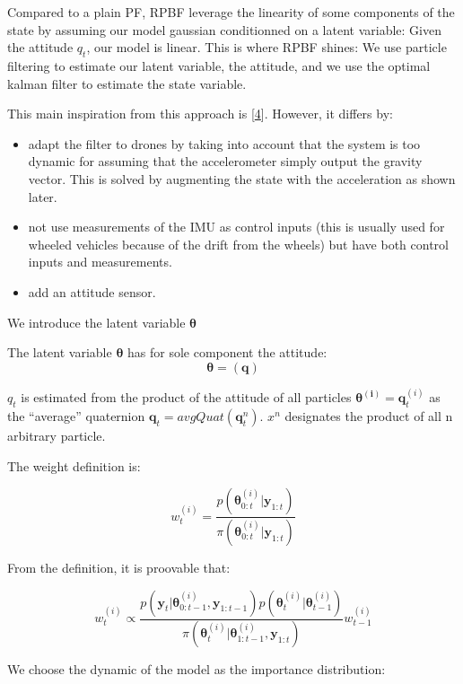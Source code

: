 \documentclass[12pt,]{article}
\providecommand{\tightlist}{%
  \setlength{\itemsep}{0pt}\setlength{\parskip}{0pt}}
\begin{document}
Compared to a plain PF, RPBF leverage the linearity of some components
of the state by assuming our model gaussian conditionned on a latent
variable: Given the attitude \(q_t\), our model is linear. This is where
RPBF shines: We use particle filtering to estimate our latent variable,
the attitude, and we use the optimal kalman filter to estimate the state
variable.

This main inspiration from this approach is
{[}\protect\hyperlink{ref-vernaza_rao-blackwellized_2006}{4}{]}.
However, it differs by:

\begin{itemize}
\tightlist
\item
  adapt the filter to drones by taking into account that the system is
  too dynamic for assuming that the accelerometer simply output the
  gravity vector. This is solved by augmenting the state with the
  acceleration as shown later.
\item
  not use measurements of the IMU as control inputs (this is usually
  used for wheeled vehicles because of the drift from the wheels) but
  have both control inputs and measurements.
\item
  add an attitude sensor.
\end{itemize}

We introduce the latent variable \(\boldsymbol{\theta}\)

The latent variable \(\boldsymbol{\theta}\) has for sole component the
attitude: \[\boldsymbol{\theta} = (\mathbf{q})\]

\(q_t\) is estimated from the product of the attitude of all particles
\(\mathbf{\theta^{(i)}} = \mathbf{q}^{(i)}_t\) as the ``average''
quaternion \(\mathbf{q}_t = avgQuat(\mathbf{q}^n_t)\). \(x^n\)
designates the product of all n arbitrary particle.

The weight definition is:

\[w^{(i)}_t = \frac{p(\boldsymbol{\theta}^{(i)}_{0:t} | \mathbf{y}_{1:t})}{\pi(\boldsymbol{\theta}^{(i)}_{0:t} | \mathbf{y}_{1:t})}\]

From the definition, it is proovable that:

\[w^{(i)}_t \propto \frac{p(\mathbf{y}_t | \boldsymbol{\theta}^{(i)}_{0:t-1}, \mathbf{y}_{1:t-1})p(\boldsymbol{\theta}^{(i)}_t | \boldsymbol{\theta}^{(i)}_{t-1})}{\pi(\boldsymbol{\theta}^{(i)}_t | \boldsymbol{\theta}^{(i)}_{1:t-1}, \mathbf{y}_{1:t})} w^{(i)}_{t-1}\]

We choose the dynamic of the model as the importance distribution:
\end{document}
